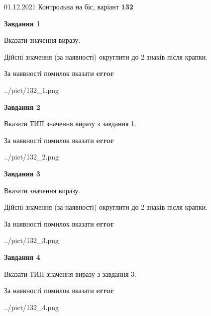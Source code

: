 \documentclass[11pt, ukrainian]{article}
\begin{document}
{01.12.2021 Контрольна на біс, варіант  \No \textbf { 132 }\par}
{
\begin {large}
{\begin {center}\textbf{Завдання 1}\end {center}}\par
Вказати значення виразу. \par
Дійсні значення (за наявності) округлити до 2 знаків після крапки. \par
За наявності помилок вказати \textbf{error}

\begin{center}
	{../pict/132_1.png}
\end{center}
\newpage

{\begin {center}\textbf{Завдання 2}\end {center}}\par
Вказати ТИП значення виразу з завдання 1. \par
За наявності помилок вказати \textbf{error}

\begin{center}
	{../pict/132_2.png}
\end{center}
\newpage

{\begin {center}\textbf{Завдання 3}\end {center}}\par
Вказати значення виразу. \par
Дійсні значення (за наявності) округлити до 2 знаків після крапки. \par
За наявності помилок вказати \textbf{error}

\begin{center}
	{../pict/132_3.png}
\end{center}
\newpage

{\begin {center}\textbf{Завдання 4}\end {center}}\par
Вказати ТИП значення виразу з завдання 3. \par
За наявності помилок вказати \textbf{error}

\begin{center}
	{../pict/132_4.png}
\end{center}
\newpage


\end{large}}
\end{document}
